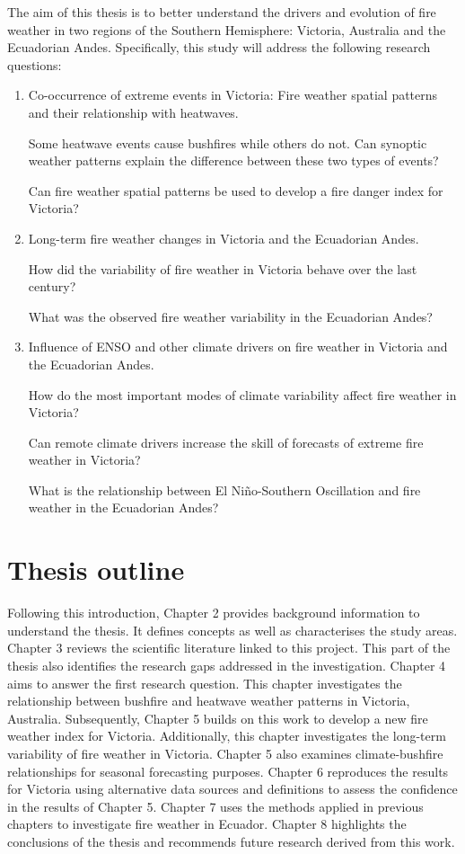 The aim of this thesis is to better understand the drivers and evolution
of fire weather in two regions of the Southern Hemisphere: Victoria,
Australia and the Ecuadorian Andes. Specifically, this study will
address the following research questions:
\begin{enumerate}
\item Co-occurrence of extreme events in Victoria: Fire weather spatial
patterns and their relationship with heatwaves. 


\textbullet{} Some heatwave events cause bushfires while others do
not. Can synoptic weather patterns explain the difference between
these two types of events? 


\textbullet Can fire weather spatial patterns be used to develop a
fire danger index for Victoria?

\item Long-term fire weather changes in Victoria and the Ecuadorian Andes.


\textbullet How did the variability of fire weather in Victoria behave
over the last century?


\textbullet{} What was the observed fire weather variability in the
Ecuadorian Andes?

\item Influence of ENSO and other climate drivers on fire weather in Victoria
and the Ecuadorian Andes.


\textbullet{} How do the most important modes of climate variability
affect fire weather in Victoria?


\textbullet{} Can remote climate drivers increase the skill of forecasts
of extreme fire weather in Victoria? 


\textbullet{} What is the relationship between El Ni\~no-Southern Oscillation
and fire weather in the Ecuadorian Andes?

\end{enumerate}

\section{Thesis outline}

Following this introduction, Chapter 2 provides background information
to understand the thesis. It defines concepts as well as characterises
the study areas. Chapter 3 reviews the scientific literature
linked to this project. This part of the thesis also identifies the
research gaps addressed in the investigation. Chapter 4 aims to answer
the first research question. This chapter investigates the relationship
between bushfire and heatwave weather patterns in Victoria, Australia.
Subsequently, Chapter 5 builds on this work to develop a new fire
weather index for Victoria. Additionally, this chapter investigates
the long-term variability of fire weather in Victoria. Chapter 5 also
examines climate-bushfire relationships for seasonal forecasting purposes.
Chapter 6 reproduces the results for Victoria using alternative data
sources and definitions to assess the confidence in the results of Chapter 5. 
Chapter 7 uses the methods applied in previous
chapters to investigate fire weather in Ecuador. Chapter 8 highlights
the conclusions of the thesis and recommends future
research derived from this work.

